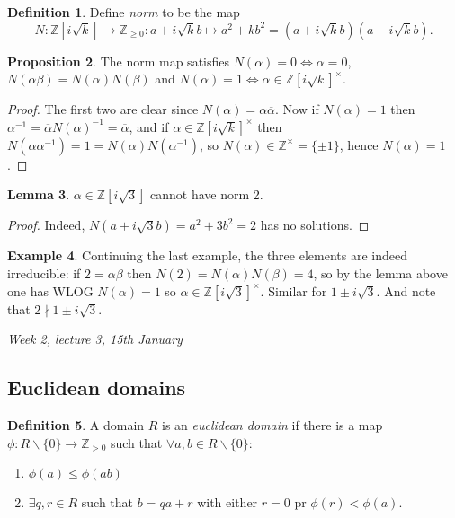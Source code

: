 \documentclass{article}
\newcommand{\Z}{\mathbb{Z}}
\theoremstyle{definition}
\newtheorem{defn}{Definition}[subsection]
\newtheorem{prop}[defn]{Proposition}
\newtheorem{lemma}[defn]{Lemma}
\newtheorem{example}[defn]{Example}
\begin{document}
\begin{defn}
Define \textit{norm} to be the map
\[
N:\Z\left[i\sqrt k\right]\rightarrow\Z_{\geq 0}:a+i\sqrt kb\mapsto a^2+kb^2=\left(a+i\sqrt kb\right)\left(a-i\sqrt kb\right).
\]
\end{defn}

\begin{prop}
The norm map satisfies $N(\alpha)=0\iff\alpha=0$, $N(\alpha\beta)=N(\alpha)N(\beta)$ and $N(\alpha)=1\iff\alpha\in\Z\left[i\sqrt k\right]^\times$.
\end{prop}
\begin{proof}
The first two are clear since $N(\alpha)=\alpha\overline\alpha$. Now if $N(\alpha)=1$ then $\alpha^{-1}=\overline\alpha N(\alpha)^{-1}=\overline\alpha$, and if $\alpha\in\Z\left[i\sqrt k\right]^\times$ then $N(\alpha\alpha^{-1})=1=N(\alpha)N(\alpha^{-1})$, so $N(\alpha)\in\Z^\times=\{\pm 1\}$, hence $N(\alpha)=1$.
\end{proof}

\begin{lemma}
$\alpha\in\Z\left[i\sqrt 3\right]$ cannot have norm 2.
\end{lemma}
\begin{proof}
Indeed, $N\left(a+i\sqrt 3b\right)=a^2+3b^2=2$ has no solutions.
\end{proof}

\begin{example}
Continuing the last example, the three elements are indeed irreducible: if $2=\alpha\beta$ then $N(2)=N(\alpha)N(\beta)=4$, so by the lemma above one has WLOG $N(\alpha)=1$ so $\alpha\in\Z\left[i\sqrt 3\right]^\times$. Similar for $1\pm i\sqrt 3$. And note that $2\nmid 1\pm i\sqrt 3$.
\end{example}

\begin{flushright}
\textit{Week 2, lecture 3, 15th January}
\end{flushright}

\subsection{Euclidean domains}
\begin{defn}
A domain $R$ is an \textit{euclidean domain} if there is a map $\phi:R\backslash\{0\}\rightarrow\Z_{>0}$ such that $\forall a,b\in R\backslash\{0\}$:
\begin{enumerate}
\item $\phi(a)\leq\phi(ab)$
\item $\exists q,r\in R$ such that $b=qa+r$ with either $r=0$ pr $\phi(r)<\phi(a)$.
\end{enumerate}
\end{defn}
\end{document}
